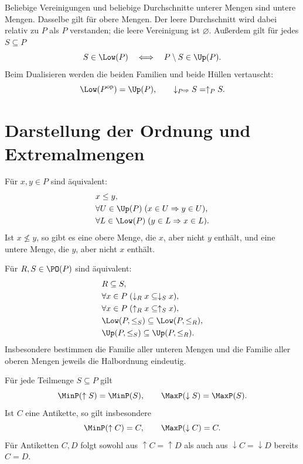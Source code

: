 \begin{theorem}
\label{b12guide:thm:set-operations}
Beliebige Vereinigungen und beliebige Durchschnitte unterer Mengen
sind untere Mengen. Dasselbe gilt für obere Mengen.
Der leere Durchschnitt wird dabei relativ zu $P$ als $P$
verstanden; die leere Vereinigung ist $\varnothing$.
Außerdem gilt für jedes $S\subseteq P$
\[
 S\in\Low(P)\quad\Longleftrightarrow\quad P\setminus S\in\Up(P).
\]
Beim Dualisieren werden die beiden Familien und beide Hüllen
vertauscht:
\[
 \Low(P^{\mathrm{op}})=\Up(P),\qquad
 \downarrow_{P^{\mathrm{op}}}S=\uparrow_P S.
\]
\end{theorem}

\section{Darstellung der Ordnung und Extremalmengen}

\begin{theorem}
\label{b12guide:thm:separation}
Für $x,y\in P$ sind äquivalent:
\[
\begin{aligned}
 &x\leq y,\\
 &\forall U\in\Up(P)\;(x\in U\Rightarrow y\in U),\\
 &\forall L\in\Low(P)\;(y\in L\Rightarrow x\in L).
\end{aligned}
\]
Ist $x\nleq y$, so gibt es eine obere Menge, die $x$, aber nicht
$y$ enthält, und eine untere Menge, die $y$, aber nicht $x$ enthält.
\end{theorem}

\begin{theorem}
\label{b12guide:thm:refinement}
Für $R,S\in\PO(P)$ sind äquivalent:
\[
\begin{aligned}
 &R\subseteq S,\\
 &\forall x\in P\;(\downarrow_R x\subseteq\downarrow_S x),\\
 &\forall x\in P\;(\uparrow_R x\subseteq\uparrow_S x),\\
 &\Low(P,\leq_S)\subseteq\Low(P,\leq_R),\\
 &\Up(P,\leq_S)\subseteq\Up(P,\leq_R).
\end{aligned}
\]
Insbesondere bestimmen die Familie aller unteren Mengen und die
Familie aller oberen Mengen jeweils die Halbordnung eindeutig.
\end{theorem}

\begin{theorem}
\label{b12guide:thm:closure-extremal}
Für jede Teilmenge $S\subseteq P$ gilt
\[
 \MinP(\uparrow S)=\MinP(S),\qquad
 \MaxP(\downarrow S)=\MaxP(S).
\]
Ist $C$ eine Antikette, so gilt insbesondere
\[
 \MinP(\uparrow C)=C,\qquad \MaxP(\downarrow C)=C.
\]
Für Antiketten $C,D$ folgt sowohl aus
$\uparrow C=\uparrow D$ als auch aus
$\downarrow C=\downarrow D$ bereits $C=D$.
\end{theorem}

